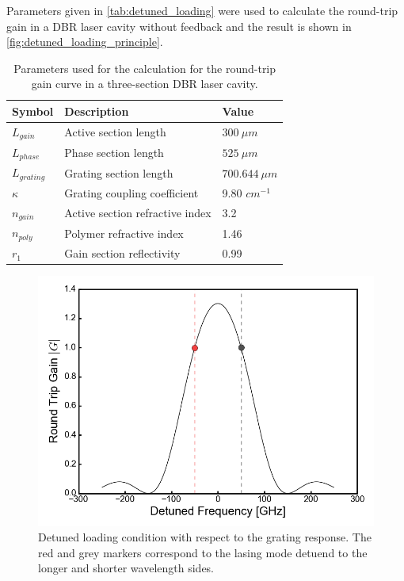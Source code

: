 Parameters given in \autoref{tab:detuned_loading} were used to calculate the round-trip gain in a DBR laser cavity without feedback and the result is shown in \autoref{fig:detuned_loading_principle}.

\begin{table}[ht]
    \centering
    \caption{Parameters used for the calculation for the round-trip gain curve in a three-section DBR laser cavity.}
    \label{tab:detuned_loading}
    \begin{tabular}{@{}lll@{}}
    \toprule
    Symbol        & Description                         & Value            \\ \midrule
    $L_{gain}$    & Active section length               & $300 \ \mu m$    \\
    $L_{phase}$   & Phase section length                & $525 \ \mu m$    \\
    $L_{grating}$ & Grating section length              & $700.644\ \mu m$ \\
    $\kappa$      & Grating coupling coefficient        & 9.80 $cm^{-1}$   \\
    $n_{gain}$      & Active section refractive index  & 3.2               \\
    $n_{poly}$    & Polymer refractive index            & 1.46             \\
    $r_1$         & Gain section  reflectivity          & 0.99             \\ \bottomrule
    \end{tabular}
\end{table}

\begin{figure}[H]
    \centering
    \includegraphics[width=.7\linewidth]{figures/detuned_loading_principle.png}
    \caption{Detuned loading condition with respect to the grating response. The red and grey markers correspond to the lasing mode detuend to the longer and shorter wavelength sides.}
    \label{fig:detuned_loading_principle}
\end{figure}

